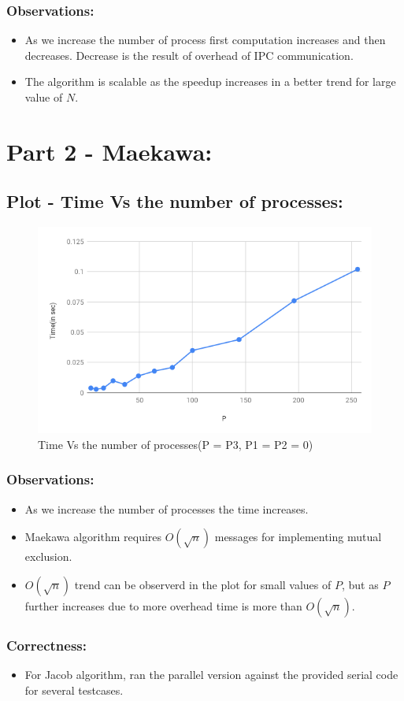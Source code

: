 \documentclass[a4 paper]{article}
\begin{document}
\subsubsection*{Observations:}
\begin{itemize}
\item As we increase the number of process first computation increases and then decreases. Decrease is the result of overhead of IPC communication.
\item The algorithm is scalable as the speedup increases in a better trend for large value of $N$.
\end{itemize}

\section*{Part 2 - Maekawa:}
\subsection*{Plot - Time Vs the number of processes:}
\begin{figure}[H]
	\centering %
	\includegraphics[width=160mm]{mak.png}
	\caption{Time Vs the number of processes(P = P3, P1 = P2 = 0)\label{MIMD}}
\end{figure}

\subsubsection*{Observations:}
\begin{itemize}
\item As we increase the number of processes the time increases.
\item Maekawa algorithm requires $O(\sqrt{n})$ messages for implementing mutual exclusion.
\item $O(\sqrt{n})$ trend can be observerd in the plot for small values of $P$, but as $P$ further increases due to more overhead time is more than $O(\sqrt{n})$.
\end{itemize}

\subsubsection*{Correctness:}
\begin{itemize}
\item For Jacob algorithm, ran the parallel version against the provided serial code for several testcases. 
\end{itemize}
\end{document}
